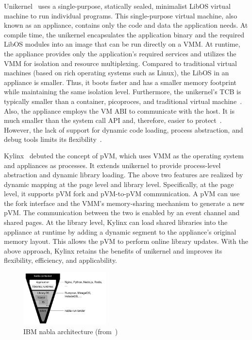 Unikernel~\cite*{10.1145/2499368.2451167} uses a single-purpose, statically sealed, minimalist LibOS virtual machine to run individual programs. This single-purpose virtual machine, also known as an appliance, contains only the code and data the application needs. At compile time, the unikernel 
encapsulates the application 
binary and the required LibOS modules into an image that can be run directly on a VMM. At runtime, the appliance provides only the application's required services and utilizes the VMM for isolation and resource multiplexing. Compared to traditional virtual machines (based on rich operating systems 
such as Linux), the LibOS in an appliance is smaller. Thus, it boots faster and has a smaller memory footprint while maintaining the same isolation level. Furthermore, the unikernel's TCB is typically smaller than a container, picoproces, and traditional virtual machine~\cite*{10.1145/3436512}. Also, the appliance 
employs the VM ABI to communicate with the host. It is much smaller than the system call API and, therefore, easier to protect~\cite*{10.1145/3436512}. However, the lack of support for dynamic code loading, process abstraction, and debug tools limits its flexibility~\cite*{10.1145/3436512, 10.1145/3267809.3267845}.

Kylinx~\cite*{10.1145/3436512} debuted the concept of pVM, which uses VMM as the operating system and appliances as processes. It extends unikernel to provide process-level abstraction and dynamic library loading. The above two features are realized by dynamic mapping at the page level and library level. 
Specifically, at the page level, it supports pVM fork and pVM-to-pVM communication. A pVM can use the fork interface and the VMM's memory-sharing mechanism to generate a new pVM. The communication between the two is enabled by an event channel and shared pages. At the library level, Kylinx 
can load shared libraries into the appliance at runtime by adding a dynamic segment to the appliance's original memory layout. This allows the pVM to perform online library updates. With the above approach, Kylinx retains the benefits of unikernel and improves its flexibility, efficiency, 
and applicability.
 
\begin{figure}[htp]
    \centering
    \includegraphics[width=0.4\textwidth]{images/nabla.png}
    \caption[IBM nabla architecture]{IBM nabla architecture (from~\cite*{Nabla})}
    \label{fig:nabla}
\end{figure}

